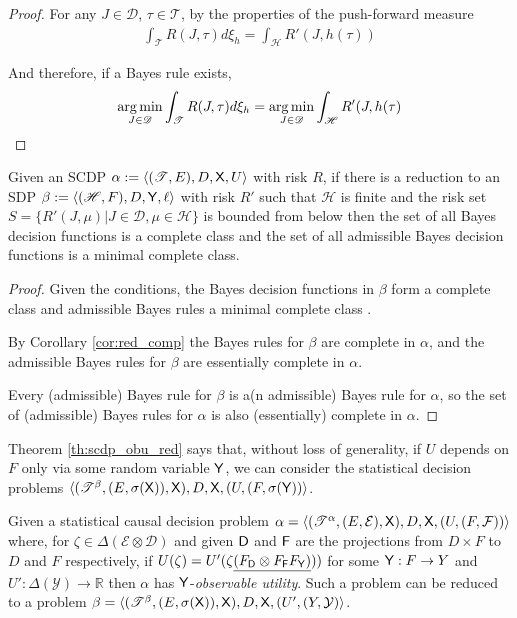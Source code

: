 \begin{proof}
For any $J\in\mathscr{D}$, $\tau\in \mathscr{T}$, by the properties of the push-forward measure
\begin{align}
    \int_{\mathscr{T}} R(J,\tau) d\xi_h = \int_\mathscr{H} R'(J,h(\tau))
\end{align}

And therefore, if a Bayes rule exists,
\begin{align}
    \operatorname*{arg\,min}_{J\in\mathscr{D}} \int_{\mathscr{T}} R(J,\tau) d\xi_h =  \operatorname*{arg\,min}_{J\in\mathscr{D}}\int_\mathscr{H} R'(J,h(\tau)
\end{align}

\end{proof}

\begin{theorem}
Given an SCDP $\alpha:=\langle (\mathscr{T},E),D,\mathsf{X},U\rangle$ with risk $R$, if there is a reduction to an SDP $\beta:=\langle (\mathscr{H},F),D,\mathsf{Y},\ell \rangle$ with risk $R'$ such that $\mathscr{H}$ is finite and the risk set $S=\{R'(J,\mu)|J\in\mathscr{D},\mu\in \mathscr{H}\}$ is bounded from below then the set of all Bayes decision functions is a complete class and the set of all admissible Bayes decision functions is a minimal complete class.
\end{theorem}

\begin{proof}
Given the conditions, the Bayes decision functions in $\beta$ form a complete class and admissible Bayes rules a minimal complete class \cite{toutenburg_ferguson_1970}.

By Corollary \ref{cor:red_comp} the Bayes rules for $\beta$ are complete in $\alpha$, and the admissible Bayes rules for $\beta$ are essentially complete in $\alpha$.

Every (admissible) Bayes rule for $\beta$ is a(n admissible) Bayes rule for $\alpha$, so the set of (admissible) Bayes rules for $\alpha$ is also (essentially) complete in $\alpha$.
\end{proof}


Theorem \ref{th:scdp_obu_red} says that, without loss of generality, if $U$ depends on $F$ only via some random variable $\mathsf{Y}$, we can consider the statistical decision problems $\langle (\mathscr{T}^\beta,(E,\sigma(\mathsf{X})),\mathsf{X}),D,\mathsf{X},(U,(F,\sigma(\mathsf{Y}))\rangle$.

\begin{theorem}\label{th:scdp_obu_red}
Given a statistical causal decision problem $\alpha=\langle (\mathscr{T}^\alpha,(E,\mathcal{E}),\mathsf{X}),D,\mathsf{X},(U,(F,\mathcal{F}))\rangle$ where, for $\zeta\in \Delta(\mathcal{E}\otimes\mathcal{D})$ and given $\mathsf{D}$ and $\mathsf{F}$ are the projections from $D\times F$ to $D$ and $F$ respectively, if $U(\zeta)=U'(\zeta\underline{(F_{\mathsf{D}}\otimes F_{\mathsf{F}} F_{\mathsf{Y}})} ))$ for some $\mathsf{Y}: F\to Y$ and $U':\Delta(\mathcal{Y})\to \mathbb{R}$ then $\alpha$ has $\mathsf{Y}$-\emph{observable utility}. Such a problem can be reduced to a problem $\beta=\langle (\mathscr{T}^\beta,(E,\sigma(\mathsf{X})),\mathsf{X}),D,\mathsf{X},(U',(Y,\mathcal{Y})\rangle$.
\end{theorem}

